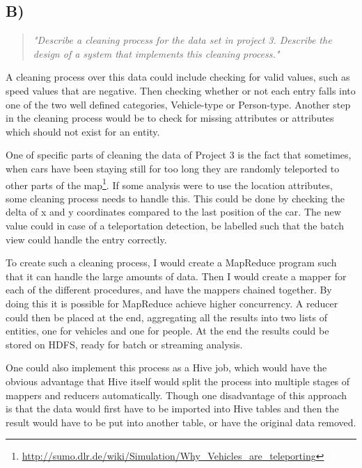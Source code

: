 \subsection{B)}
\begin{quote}
	\textit{"Describe	a	cleaning	process	for	the	data	set	in	project	3.	Describe	the	design	of	a	system	that	implements	this	cleaning	process."}
\end{quote}
A cleaning process over this data could include checking for valid values, such as speed values that are negative. Then checking whether or not each entry falls into one of the two well defined categories, Vehicle-type or Person-type. Another step in the cleaning process would be to check for missing attributes or attributes which should not exist for an entity.

\newpar One of specific parts of cleaning the data of Project 3 is the fact that sometimes, when cars have been staying still for too long they are randomly teleported to other parts of the map\footnote{\url{http://sumo.dlr.de/wiki/Simulation/Why_Vehicles_are_teleporting}}. If some analysis were to use the location attributes, some cleaning process needs to handle this. This could be done by checking the delta of x and y coordinates compared to the last position of the car. The new value could in case of a teleportation detection, be labelled such that the batch view could handle the entry correctly.

\newpar To create such a cleaning process, I would create a MapReduce program such that it can handle the large amounts of data. Then I would create a mapper for each of the different procedures, and have the mappers chained together. By doing this it is possible for MapReduce achieve higher concurrency. A reducer could then be placed at the end, aggregating all the results into two lists of entities, one for vehicles and one for people. At the end the results could be stored on HDFS, ready for batch or streaming analysis.

One could also implement this process as a Hive job, which would have the obvious advantage that Hive itself would split the process into multiple stages of mappers and reducers automatically. Though one disadvantage of this approach is that the data would first have to be imported into Hive tables and then the result would have to be put into another table, or have the original data removed.